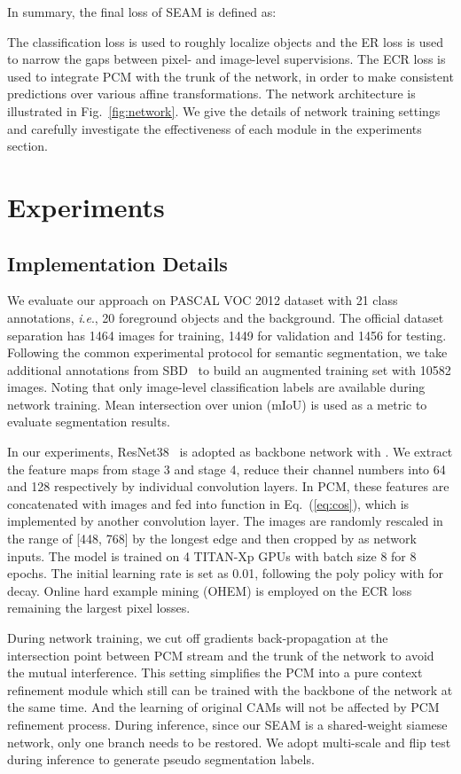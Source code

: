 \documentclass[10pt,twocolumn,letterpaper]{article}
\begin{document}
	In summary, the final loss of SEAM is defined as:
	
	The classification loss is used to roughly localize objects and the ER loss is used to narrow the gaps between pixel- and image-level supervisions. The ECR loss is used to integrate PCM with the trunk of the network, in order to make consistent predictions over various affine transformations. The network architecture is illustrated in Fig.~\ref{fig:network}. We give the details of network training settings and carefully investigate the effectiveness of each module in the experiments section.
	
	\section{Experiments}
	
	\subsection{Implementation Details}
    We evaluate our approach on PASCAL VOC 2012 dataset with 21 class annotations, \textit{i}.\textit{e}., 20 foreground objects and the background. The official dataset separation has 1464 images for training, 1449 for validation and 1456 for testing. Following the common experimental protocol for semantic segmentation, we take additional annotations from SBD~\cite{SBD} to build an augmented training set with 10582 images. Noting that only image-level classification labels are available during network training. Mean intersection over union (mIoU) is used as a metric to evaluate segmentation results.

	In our experiments, ResNet38~\cite{resnet38} is adopted as backbone network with . We extract the feature maps from stage 3 and stage 4, reduce their channel numbers into 64 and 128 respectively by individual  convolution layers. In PCM, these features are concatenated with images and fed into function  in Eq.~(\ref{eq:cos}), which is implemented by another  convolution layer. The images are randomly rescaled in the range of [448, 768] by the longest edge and then cropped by  as network inputs. The model is trained on 4 TITAN-Xp GPUs with batch size 8 for 8 epochs. The initial learning rate is set as 0.01, following the poly policy  with  for decay. Online hard example mining (OHEM) is employed on the ECR loss remaining the largest  pixel losses.

	During network training, we cut off gradients back-propagation at the intersection point between PCM stream and the trunk of the network to avoid the mutual interference. This setting simplifies the PCM into a pure context refinement module which still can be trained with the backbone of the network at the same time. And the learning of original CAMs will not be affected by PCM refinement process. During inference, since our SEAM is a shared-weight siamese network, only one branch needs to be restored. We adopt multi-scale and flip test during inference to generate pseudo segmentation labels.
	
\end{document}
